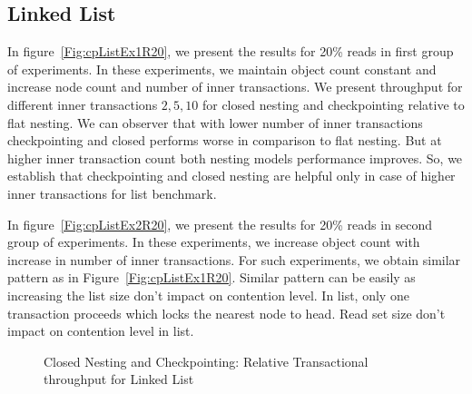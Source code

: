 \documentclass[12pt,english]{report}
\begin{document}
\subsection{Linked List}
In figure~\ref{Fig:cpListEx1R20}, we present the results for 20\% reads in first group of experiments. In these experiments, we maintain object count constant and increase node count and number of inner transactions. We present throughput for different inner transactions ${2, 5, 10}$ for closed nesting and checkpointing relative to flat nesting. We can observer that with lower number of inner transactions checkpointing and closed performs worse in comparison to flat nesting. But at higher inner transaction count both nesting models performance improves. So, we establish that checkpointing and closed nesting are helpful only in case of higher inner transactions for list benchmark.

In figure~\ref{Fig:cpListEx2R20}, we present the results for 20\% reads in second group of experiments. In these experiments, we increase object count with increase in number of inner transactions. For such experiments, we obtain similar pattern as in Figure~\ref{Fig:cpListEx1R20}. Similar pattern can be easily as increasing the list size don't impact on contention level. In list, only one transaction proceeds which locks the nearest node to head. Read set size don't impact on contention level in list.

\begin{figure}[H]
\centering
{}
\end{figure}
\begin{figure}[H]
\centering
{}
\end{figure}
\begin{figure}[H]
\centering
{}
\caption{Closed Nesting and Checkpointing: Relative Transactional throughput for Linked List}
\label{Fig:cpList}
\end{figure}
\end{document}
